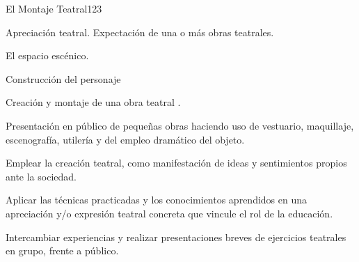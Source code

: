 \begin{syllabus}
\begin{unit}{El  Montaje Teatral}{}{12}{3}
\begin{topics}
	\item Apreciación teatral. Expectación de una o más obras teatrales.
	\item El espacio escénico.
	\item Construcción del personaje
	\item Creación y montaje de una obra teatral .
	\item Presentación en público de pequeñas obras haciendo uso de vestuario, maquillaje, escenografía, utilería y del empleo dramático del objeto.
\end{topics}
\begin{learningoutcomes}
	\item Emplear  la creación teatral, como manifestación de ideas y sentimientos propios ante la sociedad.
	\item Aplicar las técnicas practicadas y los conocimientos aprendidos en una apreciación y/o expresión teatral concreta que vincule el rol de la educación.
	\item Intercambiar experiencias y realizar presentaciones breves de ejercicios teatrales en grupo, frente a público.  
\end{learningoutcomes}
\end{unit}



\begin{coursebibliography}

\end{coursebibliography}
\end{syllabus}
